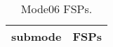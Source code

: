 \begin{table}[h!]
\begin{center}
\begin{tabular}{cl}
\hline
submode& FSPs\\
\hline
\hline
\end{tabular}
\label{tab:Mode06FSPs}
\caption{Mode06 FSPs.}
\end{center}
\end{table}
